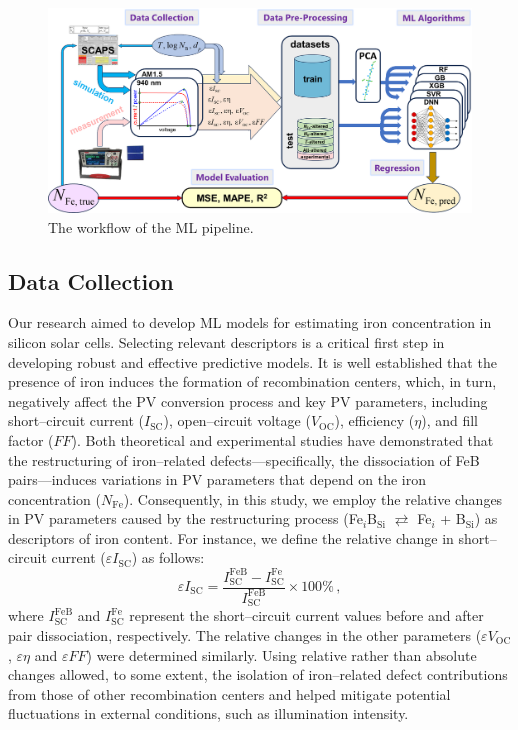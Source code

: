 \documentclass[a4paper,fleqn]{cas-sc}
\begin{document}
\begin{figure}
	\centering
		\includegraphics[width=0.9\linewidth]{fig1.png}
	  \caption{The workflow of the ML pipeline.}\label{fig1}
\end{figure}

\subsection{Data Collection}
\par
Our research aimed to develop ML models for estimating iron concentration in silicon solar cells. 
Selecting relevant descriptors is a critical first step in developing robust and effective predictive models. 
It is well established that the presence of iron induces the formation of recombination centers, which, in turn, negatively affect the PV conversion process and key PV parameters, including short--circuit current ($I_\mathrm{SC}$), open--circuit voltage ($V_\mathrm{OC}$), efficiency ($\eta$), and fill factor ($F\!F$). 
Both theoretical and experimental studies \cite{FeB:Schmidt, IronSC, OUR WORK} have demonstrated that the restructuring of iron--related defects—specifically, the dissociation of FeB pairs—induces variations in PV parameters that depend on the iron concentration ($N_\mathrm{Fe}$). 
Consequently, in this study, we employ the relative changes in PV parameters caused by the restructuring process (Fe$_i$B$_\mathrm{Si}$ $\rightleftarrows$ Fe$_i$ + B$_\mathrm{Si}$) as descriptors of iron content. 
For instance, we define the relative change in short--circuit current ($\varepsilon I_\mathrm{SC}$) as follows:
\begin{equation}
\label{eq1}
    \varepsilon I_\mathrm{SC} = \frac{I_\mathrm{SC}^\mathrm{FeB} - I_\mathrm{SC}^\mathrm{Fe}}{I_\mathrm{SC}^\mathrm{FeB}} \times 100 \%\,,
\end{equation}
where $I_\mathrm{SC}^\mathrm{FeB}$ and $I_\mathrm{SC}^\mathrm{Fe}$ represent the short--circuit current values before and after pair dissociation, respectively. 
The relative changes in the other parameters ($\varepsilon V_\mathrm{OC}$, $\varepsilon \eta$ and $\varepsilon F\!F$) were determined similarly. 
Using relative rather than absolute changes allowed, to some extent, the isolation of iron--related defect contributions from those of other recombination centers and helped mitigate potential fluctuations in external conditions, such as illumination intensity.
\end{document}
